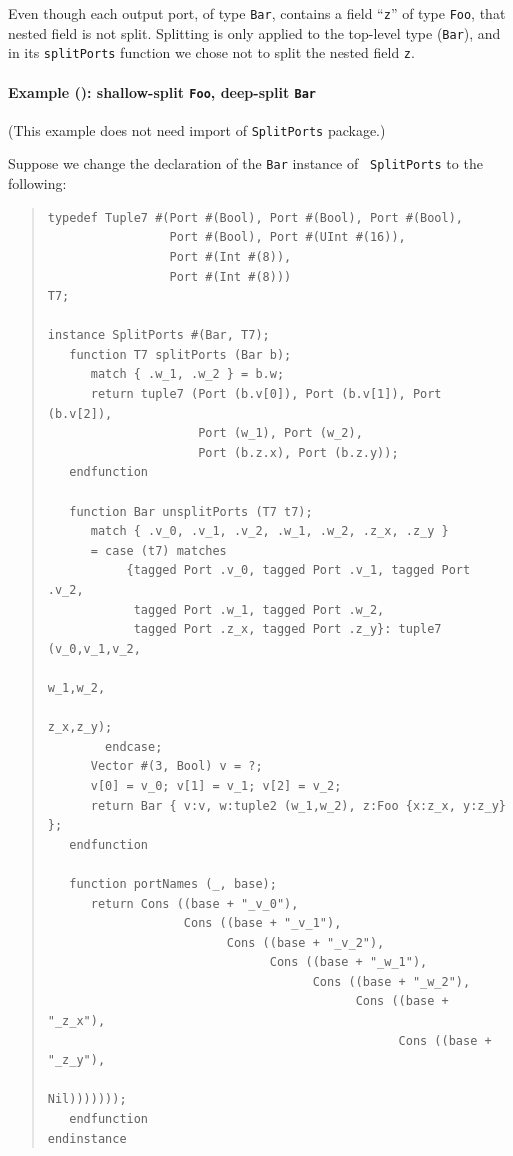 Even though each output port, of type {\tt Bar}, contains a field
``{\tt z}'' of type {\tt Foo}, that nested field is not split.
Splitting is only applied to the top-level type ({\tt Bar}), and in
its {\tt splitPorts} function we chose not to split the nested field
{\tt z}.


\paragraph{Example (\BSV): shallow-split {\tt Foo}, deep-split {\tt Bar}}

\label{sec:splitports_examples_BSV_Foo_Shallow_Bar_Deep}

\hspace*{1em}

{\footnotesize (This example does not need import of {\tt SplitPorts} package.)}

Suppose we change the declaration of the {\tt Bar} instance of {\tt
SplitPorts} to the following:

\begin{quote}
\begin{verbatim}
typedef Tuple7 #(Port #(Bool), Port #(Bool), Port #(Bool),
                 Port #(Bool), Port #(UInt #(16)),
                 Port #(Int #(8)),
                 Port #(Int #(8)))                            T7;

instance SplitPorts #(Bar, T7);
   function T7 splitPorts (Bar b);
      match { .w_1, .w_2 } = b.w;
      return tuple7 (Port (b.v[0]), Port (b.v[1]), Port (b.v[2]),
                     Port (w_1), Port (w_2),
                     Port (b.z.x), Port (b.z.y));
   endfunction

   function Bar unsplitPorts (T7 t7);
      match { .v_0, .v_1, .v_2, .w_1, .w_2, .z_x, .z_y }
      = case (t7) matches
           {tagged Port .v_0, tagged Port .v_1, tagged Port .v_2,
            tagged Port .w_1, tagged Port .w_2,
            tagged Port .z_x, tagged Port .z_y}: tuple7 (v_0,v_1,v_2,
                                                         w_1,w_2,
                                                         z_x,z_y);
        endcase;
      Vector #(3, Bool) v = ?;
      v[0] = v_0; v[1] = v_1; v[2] = v_2;
      return Bar { v:v, w:tuple2 (w_1,w_2), z:Foo {x:z_x, y:z_y} };
   endfunction

   function portNames (_, base);
      return Cons ((base + "_v_0"),
                   Cons ((base + "_v_1"),
                         Cons ((base + "_v_2"),
                               Cons ((base + "_w_1"),
                                     Cons ((base + "_w_2"),
                                           Cons ((base + "_z_x"),
                                                 Cons ((base + "_z_y"),
                                                       Nil)))))));
   endfunction
endinstance
\end{verbatim}
\end{quote}

